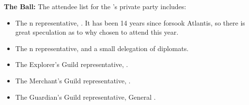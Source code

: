 \documentclass[blue]{NeptuneBall}
\begin{document}
{\bf The \cExExKing{} Ball:}
The attendee list for the \cKing{\King}'s private party includes:
\begin{itemize}
  \item The \pAmerica{}n representative, \cAriel{\King} \cAriel{}. It has been 14 years since \cAriel{} forsook Atlantis, so there is great speculation as to why \cAriel{\they} \cAriel{\have} chosen to attend this year.
  \item The \pPacifica{}n representative, \cPrince{\Prince} \cPrince{} and a small delegation of diplomats.
  \item The Explorer's Guild representative, \cPriest{}.
  \item The Merchant's Guild representative, \cSlave{}.
  \item The Guardian's Guild representative, General \cGeneral{}.
\end{itemize}
\end{document}
